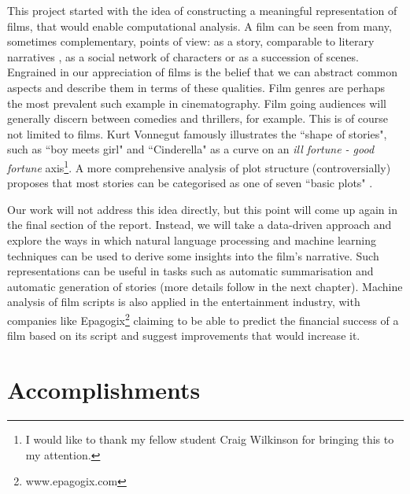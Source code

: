 \documentclass[bsc,frontabs,deptreport,singlespacing,parskip, twoside]{infthesis}
\begin{document}
This project started with the idea of constructing a meaningful representation of films, that would enable computational analysis. A film can be seen from many, sometimes complementary, points of view: as a story, comparable to literary narratives \cite{jinks1971celluloid}, as a social network of characters or as a succession of scenes. Engrained in our appreciation of films is the belief that we can abstract common aspects and describe them in terms of these qualities. Film genres are perhaps the most prevalent such example in cinematography. Film going audiences will generally discern between comedies and thrillers, for example. This is of course not limited to films. Kurt Vonnegut \cite{vonnegut2011man} famously illustrates the ``shape of stories", such as ``boy meets girl" and ``Cinderella" as a curve on an \textit{ill fortune - good fortune} axis\footnote{I would like to thank my fellow student Craig Wilkinson for bringing this to my attention.}. A more comprehensive analysis of plot structure (controversially) proposes that most stories can be categorised as one of seven ``basic plots" \cite{booker2004seven}.

Our work will not address this idea directly, but this point will come up again in the final section of the report. Instead, we will take a data-driven approach and explore the ways in which natural language processing and machine learning techniques can be used to derive some insights into the film's narrative. Such representations can be useful in tasks such as automatic summarisation and automatic generation of stories (more details follow in the next chapter). Machine analysis of film scripts is also applied in the entertainment industry, with companies like Epagogix\footnote{www.epagogix.com} claiming to be able to predict the financial success of a film based on its script and suggest improvements that would increase it.

\section{Accomplishments}
\end{document}
